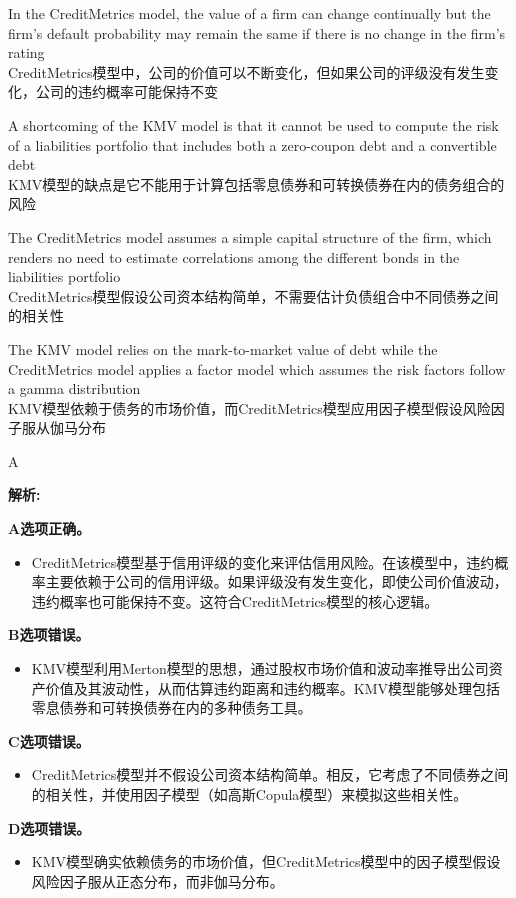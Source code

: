 \documentclass{article}
\newenvironment{explanation}
{\textbf{解析:}\par}
{\par}
\begin{document}
\begin{choices}
    \item In the CreditMetrics model, the value of a firm can change continually but the firm's default probability may remain the same if there is no change in the firm's rating\\
    CreditMetrics模型中，公司的价值可以不断变化，但如果公司的评级没有发生变化，公司的违约概率可能保持不变
    \item A shortcoming of the KMV model is that it cannot be used to compute the risk of a liabilities portfolio that includes both a zero-coupon debt and a convertible debt\\
    KMV模型的缺点是它不能用于计算包括零息债券和可转换债券在内的债务组合的风险
    \item The CreditMetrics model assumes a simple capital structure of the firm, which renders no need to estimate correlations among the different bonds in the liabilities portfolio\\
    CreditMetrics模型假设公司资本结构简单，不需要估计负债组合中不同债券之间的相关性
    \item The KMV model relies on the mark-to-market value of debt while the CreditMetrics model applies a factor model which assumes the risk factors follow a gamma distribution\\
    KMV模型依赖于债务的市场价值，而CreditMetrics模型应用因子模型假设风险因子服从伽马分布
\end{choices}

\begin{correctanswer}
    A
\end{correctanswer}

\begin{explanation}
    \textbf{A选项正确。}
    \begin{itemize}
    \item CreditMetrics模型基于信用评级的变化来评估信用风险。在该模型中，违约概率主要依赖于公司的信用评级。如果评级没有发生变化，即使公司价值波动，违约概率也可能保持不变。这符合CreditMetrics模型的核心逻辑。
    \end{itemize}

    \textbf{B选项错误。}
    \begin{itemize}
    \item KMV模型利用Merton模型的思想，通过股权市场价值和波动率推导出公司资产价值及其波动性，从而估算违约距离和违约概率。KMV模型能够处理包括零息债券和可转换债券在内的多种债务工具。
    \end{itemize}

    \textbf{C选项错误。}
    \begin{itemize}
    \item CreditMetrics模型并不假设公司资本结构简单。相反，它考虑了不同债券之间的相关性，并使用因子模型（如高斯Copula模型）来模拟这些相关性。
    \end{itemize}

    \textbf{D选项错误。}
    \begin{itemize}
    \item KMV模型确实依赖债务的市场价值，但CreditMetrics模型中的因子模型假设风险因子服从正态分布，而非伽马分布。
    \end{itemize}
\end{explanation}
\end{document}
